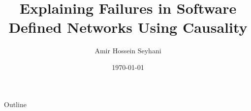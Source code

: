 \documentclass{beamer}
\date{\today}
\title{Explaining Failures in Software Defined Networks 
Using Causality }
\author{Amir Hossein Seyhani}
\institute{
    University of Tehran \linebreak \  \\
    \texttt{[image: ./resources/ut.png]}
}
\begin{document}
\frame[plain]{\titlepage}

\begin{frame}{Outline}
    \tableofcontents
\end{frame}






















\end{document}
